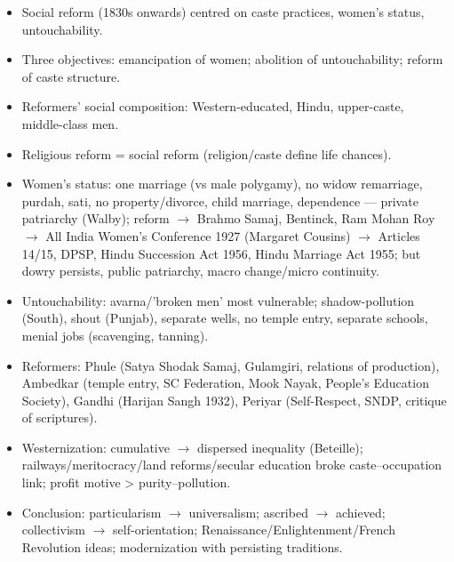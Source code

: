 \begin{QuickRevision}
\begin{itemize}
\item Social reform (1830s onwards) centred on caste practices, women's status, untouchability.
\item Three objectives: emancipation of women; abolition of untouchability; reform of caste structure.
\item Reformers' social composition: Western-educated, Hindu, upper-caste, middle-class men.
\item Religious reform = social reform (religion/caste define life chances).
\item Women's status: one marriage (vs male polygamy), no widow remarriage, purdah, sati, no property/divorce, child marriage, dependence --- private patriarchy (Walby); reform $\rightarrow$ Brahmo Samaj, Bentinck, Ram Mohan Roy $\rightarrow$ All India Women's Conference 1927 (Margaret Cousins) $\rightarrow$ Articles 14/15, DPSP, Hindu Succession Act 1956, Hindu Marriage Act 1955; but dowry persists, public patriarchy, macro change/micro continuity.
\item Untouchability: avarna/'broken men' most vulnerable; shadow-pollution (South), shout (Punjab), separate wells, no temple entry, separate schools, menial jobs (scavenging, tanning).
\item Reformers: Phule (Satya Shodak Samaj, Gulamgiri, relations of production), Ambedkar (temple entry, SC Federation, Mook Nayak, People's Education Society), Gandhi (Harijan Sangh 1932), Periyar (Self-Respect, SNDP, critique of scriptures).
\item Westernization: cumulative $\rightarrow$ dispersed inequality (Beteille); railways/meritocracy/land reforms/secular education broke caste--occupation link; profit motive > purity--pollution.
\item Conclusion: particularism $\rightarrow$ universalism; ascribed $\rightarrow$ achieved; collectivism $\rightarrow$ self-orientation; Renaissance/Enlightenment/French Revolution ideas; modernization with persisting traditions.
\end{itemize}
\end{QuickRevision}

